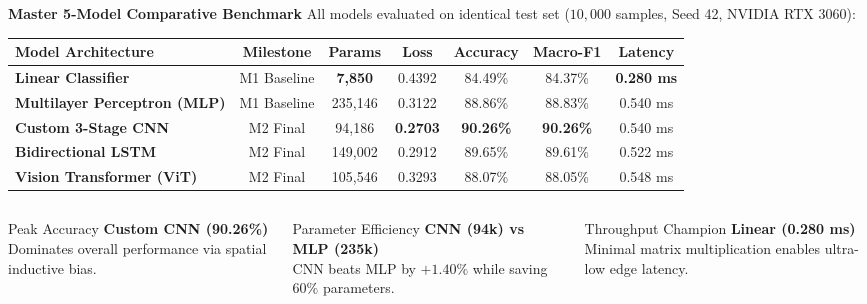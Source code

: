 \documentclass[aspectratio=169, 10pt]{beamer}
\begin{document}
\begin{frame}{\textbf{Master 5-Model Comparative Benchmark}}
  \small
  All models evaluated on identical test set ($10{,}000$ samples, Seed 42, NVIDIA RTX 3060):
  \vspace{0.4em}
  \centering
  \renewcommand{\arraystretch}{1.15}
  \begin{tabular}{lcccccc}
    \toprule
    \textbf{Model Architecture} & \textbf{Milestone} & \textbf{Params} & \textbf{Loss} & \textbf{Accuracy} & \textbf{Macro-F1} & \textbf{Latency} \\
    \midrule
    \textbf{Linear Classifier} & M1 Baseline & \textbf{7,850} & 0.4392 & 84.49\% & 84.37\% & \textbf{0.280 ms} \\
    \textbf{Multilayer Perceptron (MLP)} & M1 Baseline & 235,146 & 0.3122 & 88.86\% & 88.83\% & 0.540 ms \\
    \rowcolor{hcmutlight}
    \textbf{Custom 3-Stage CNN} & M2 Final & 94,186 & \textbf{0.2703} & \textbf{90.26\%} & \textbf{90.26\%} & 0.540 ms \\
    \textbf{Bidirectional LSTM} & M2 Final & 149,002 & 0.2912 & 89.65\% & 89.61\% & 0.522 ms \\
    \textbf{Vision Transformer (ViT)} & M2 Final & 105,546 & 0.3293 & 88.07\% & 88.05\% & 0.548 ms \\
    \bottomrule
  \end{tabular}
  \vspace{0.5em}
  \begin{columns}[c]
    \begin{column}{0.32\textwidth}
      \begin{block}{\centering \footnotesize Peak Accuracy}
        \centering\scriptsize
        \textbf{Custom CNN (90.26\%)}\\
        Dominates overall performance via spatial inductive bias.
      \end{block}
    \end{column}
    \begin{column}{0.32\textwidth}
      \begin{block}{\centering \footnotesize Parameter Efficiency}
        \centering\scriptsize
        \textbf{CNN (94k) vs MLP (235k)}\\
        CNN beats MLP by $+1.40\%$ while saving $60\%$ parameters.
      \end{block}
    \end{column}
    \begin{column}{0.32\textwidth}
      \begin{block}{\centering \footnotesize Throughput Champion}
        \centering\scriptsize
        \textbf{Linear (0.280 ms)}\\
        Minimal matrix multiplication enables ultra-low edge latency.
      \end{block}
    \end{column}
  \end{columns}
\end{frame}
\end{document}
